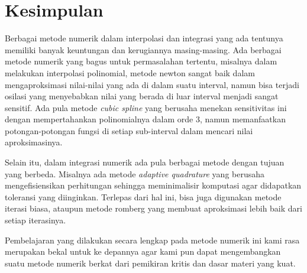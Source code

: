 \documentclass[11pt, a4paper, onecolumn, oneside, final]{report}
\begin{document}
\section*{Kesimpulan}

Berbagai metode numerik dalam interpolasi dan integrasi yang ada tentunya memiliki banyak keuntungan dan kerugiannya masing-masing. Ada berbagai metode numerik yang bagus untuk permasalahan tertentu, misalnya dalam melakukan interpolasi polinomial, metode newton sangat baik dalam mengaproksimasi nilai-nilai yang ada di dalam suatu interval, namun bisa terjadi osilasi yang menyebabkan nilai yang berada di luar interval menjadi sangat sensitif. Ada pula metode \textit{cubic spline} yang berusaha menekan sensitivitas ini dengan mempertahankan polinomialnya dalam orde 3, namun memanfaatkan potongan-potongan fungsi di setiap sub-interval dalam mencari nilai aproksimasinya.

Selain itu, dalam integrasi numerik ada pula berbagai metode dengan tujuan yang berbeda. Misalnya ada metode \textit{adaptive quadrature} yang berusaha mengefisiensikan perhitungan sehingga meminimalisir komputasi agar didapatkan toleransi yang diinginkan. Terlepas dari hal ini, bisa juga digunakan metode iterasi biasa, ataupun metode romberg yang membuat aproksimasi lebih baik dari setiap iterasinya.

Pembelajaran yang dilakukan secara lengkap pada metode numerik ini kami rasa merupakan bekal untuk ke depannya agar kami pun dapat mengembangkan suatu metode numerik berkat dari pemikiran kritis dan dasar materi yang kuat.

\nocite{*}


\end{document}
